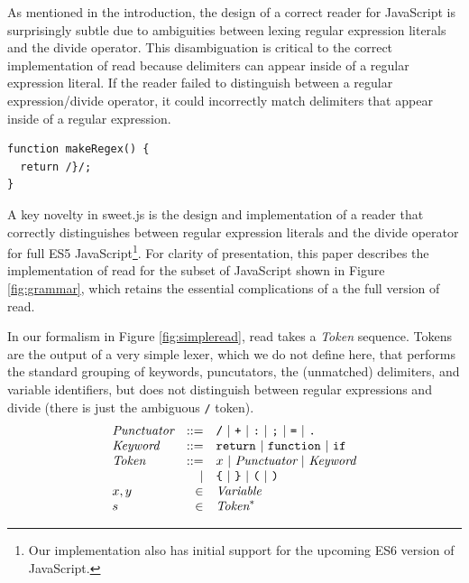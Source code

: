 \documentclass[preprint,10pt]{sigplanconf}
\begin{document}
As mentioned in the introduction, the design of a correct reader for JavaScript is surprisingly subtle due to ambiguities between lexing regular expression literals and the divide operator. This disambiguation is critical to the correct implementation of read because delimiters can appear inside of a regular expression literal. If the reader failed to distinguish between a regular expression/divide operator, it could incorrectly match delimiters that appear inside of a regular expression.
\begin{lstlisting}
function makeRegex() {
  return /}/;  
}
\end{lstlisting}

A key novelty in sweet.js is the design and implementation of a
reader that correctly distinguishes between regular expression literals and the divide operator for full ES5 JavaScript\footnote{Our implementation
  also has initial support for the upcoming ES6 version of
  JavaScript.}. For clarity of presentation, this paper describes the
implementation of read for the subset of JavaScript shown in Figure
\ref{fig:grammar}, which retains the essential complications of a
the full version of read.

In our formalism in Figure \ref{fig:simpleread}, read takes a \textit{Token} sequence. Tokens are the output of a very simple lexer, which we do not define here, that performs the standard grouping of keywords, puncutators, the (unmatched) delimiters, and variable identifiers, but does not distinguish between regular expressions and divide (\ie there is just the ambiguous \texttt{/} token).
\[
\begin{array}{lrl}
  \textit{Punctuator} &::=& \texttt{/} ~|~ \texttt{+} ~|~ \texttt{:} ~|~
  \texttt{;} ~|~ \texttt{=} ~|~ \texttt{.}
  \\
  \textit{Keyword} &::=& \texttt{return} ~|~ \texttt{function}~|~ \texttt{if}
  \\
  \textit{Token} &::=& x ~|~ \textit{Punctuator} ~|~ \textit{Keyword}
  \\
  &|& 
  \texttt{\{} ~|~ 
  \texttt {\}} ~|~  
  \texttt{(} ~|~ 
  \texttt{)}
  \\
  x, y &\in& \textit{Variable}
  \\
  s &\in& \textit{Token}^{*}
 \end{array}
\]
\end{document}

